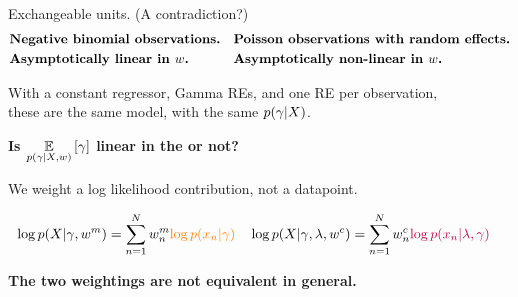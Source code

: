 \begin{frame}[t]{Exchangeable units.  (A contradiction?)}
    \vspace{-1em}
    \begin{align*}
    &\text{\textbf{Negative binomial observations.}}
    &
    &\text{\textbf{Poisson observations with random effects.}}
    \\
    &\text{\textbf{Asymptotically linear in $w$.}}
    &
    &\text{\textbf{Asymptotically non-linear in $w$.}}
    \end{align*}
    \begin{center}
    With a constant regressor, Gamma REs, and one RE per observation,\\
    these are the same model, with the same $p(\gamma \vert X)$.
    
    \textbf{Is $\underset{p(\gamma \vert X, w)}{\mathbb{E}}\left[\gamma\right]$
    linear in the 
    or not?}
    
    \spskip

    \textbf{}  We weight a log likelihood
    contribution, not a datapoint.

    \begin{align*}
        &\log p(X \vert \gamma, w^{m}) =
            \sum_{n=1}^N w^{m}_n 
            \textcolor{orange}{\log p(x_n \vert \gamma)}
        &
        &\log p(X \vert \gamma, \lambda, w^{c}) =
            \sum_{n=1}^N w^{c}_n 
            \textcolor{purple}{\log p(x_n \vert \lambda, \gamma)}
    \end{align*}
        

    \textbf{The two weightings are not equivalent in general.}

    
    \end{center}
\end{frame}


